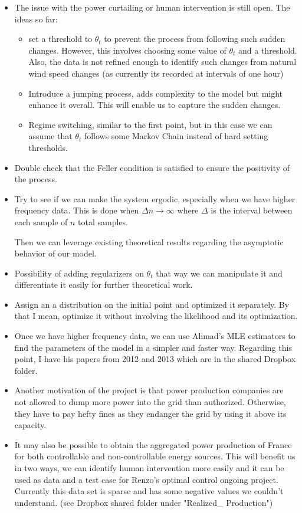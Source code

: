 \documentclass[a4paper, 12pt]{article}
\begin{document}
\begin{itemize}
\item The issue with the power curtailing or human intervention is still open. The ideas so far:
\begin{itemize}
\item set a threshold to $\theta_t$ to prevent the process from following such sudden changes. However, this involves choosing some value of $\theta_t$ and a threshold. Also, the data is not refined enough to identify such changes from natural wind speed changes (as currently its recorded at intervals of one hour)
\item Introduce a jumping process, adds complexity to the model but might enhance it overall. This will enable us to capture the sudden changes.
\item Regime switching, similar to the first point, but in this case we can assume that $\theta_t$ follows some Markov Chain instead of hard setting thresholds.
\end{itemize}
\item Double check that the Feller condition is satisfied to ensure the positivity  of the process.
\item Try to see if we can make the system ergodic, especially when we have higher frequency data. This is done when $\Delta n \to \infty$ where $\Delta$ is the interval between each sample of $n$ total samples.

 Then we can leverage existing theoretical results regarding the asymptotic behavior of our model.
\item Possibility of adding regularizers on $\theta_t$ that way we can manipulate it and differentiate it easily for further theoretical work.

\item Assign an a distribution on the initial point and optimized it separately. By that I mean, optimize it without involving the likelihood and its optimization.

\item Once we have higher frequency data, we can use Ahmad's MLE estimators to find the parameters of the model in a simpler and faster way. Regarding this point, I have his papers from 2012 and 2013 which are in the shared Dropbox folder.

\item Another motivation of the project is that power production companies are not allowed to dump more power into the grid than authorized. Otherwise, they have to pay hefty fines as they endanger the grid by using it above its capacity.

\item It may also be possible to obtain the aggregated power production of France for both controllable and non-controllable energy sources. This will benefit us in two ways, we can identify  human intervention more easily and it can be used as data and a test case for Renzo's optimal control ongoing project. Currently this data set is sparse and has some negative values we couldn't understand. (see Dropbox shared folder under "Realized\_ Production")

\end{itemize}
\end{document}
